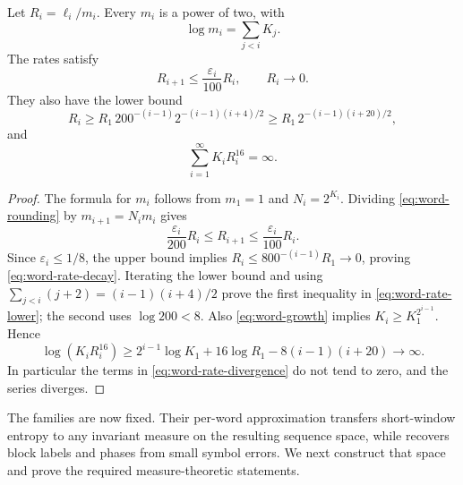 \begin{lemma}\label{lem:rates}
Let $R_i=\ell_i/m_i$.  Every $m_i$ is a power of two, with
\[
  \log m_i=\sum_{j<i}K_j.
\]
The rates satisfy
\begin{equation}\label{eq:word-rate-decay}
  R_{i+1}\le\frac{\varepsilon_i}{100}R_i,
  \qquad R_i\longrightarrow0.
\end{equation}
They also have the lower bound
\begin{equation}\label{eq:word-rate-lower}
 R_i\ge R_1\,200^{-(i-1)}
          2^{-(i-1)(i+4)/2}
     \ge R_1\,2^{-(i-1)(i+20)/2},
\end{equation}
and
\begin{equation}\label{eq:word-rate-divergence}
  \sum_{i=1}^{\infty}K_iR_i^{16}=\infty.
\end{equation}
\end{lemma}
\begin{proof}
The formula for $m_i$ follows from $m_1=1$ and $N_i=2^{K_i}$.
Dividing \eqref{eq:word-rounding} by $m_{i+1}=N_i m_i$ gives
\[
 \frac{\varepsilon_i}{200}R_i
 \le R_{i+1}\le\frac{\varepsilon_i}{100}R_i.
\]
Since $\varepsilon_i\le1/8$, the upper bound implies
$R_i\le800^{-(i-1)}R_1\to0$, proving
\eqref{eq:word-rate-decay}. Iterating the lower bound and using
$\sum_{j<i}(j+2)=(i-1)(i+4)/2$ prove the first inequality in
\eqref{eq:word-rate-lower}; the second uses $\log200<8$.
Also \eqref{eq:word-growth} implies
$K_i\ge K_1^{2^{i-1}}$.  Hence
\[
 \log(K_iR_i^{16})
  \ge 2^{i-1}\log K_1+16\log R_1-8(i-1)(i+20)
  \longrightarrow\infty.
\]
In particular the terms in \eqref{eq:word-rate-divergence} do not
tend to zero, and the series diverges.
\end{proof}

The families are now fixed.  Their per-word approximation transfers
short-window entropy to any invariant measure on the resulting
sequence space, while  recovers block labels
and phases from small symbol errors.  We next construct that space
and prove the required measure-theoretic statements.
